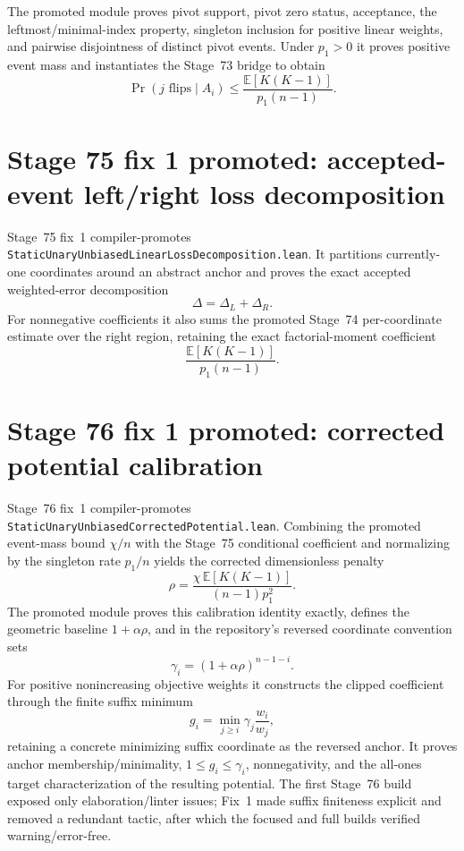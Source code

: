 \documentclass[11pt]{article}
\begin{document}
The promoted module proves pivot support, pivot zero status, acceptance, the leftmost/minimal-index property, singleton inclusion for positive linear weights, and pairwise disjointness of distinct pivot events. Under $p_1>0$ it proves positive event mass and instantiates the Stage~73 bridge to obtain
\[
  \Pr(j\text{ flips}\mid A_i)\le
  \frac{\mathbb E[K(K-1)]}{p_1(n-1)}.
\]

\section{Stage 75 fix 1 promoted: accepted-event left/right loss decomposition}

Stage~75 fix~1 compiler-promotes \texttt{StaticUnaryUnbiasedLinearLossDecomposition.lean}. It partitions currently-one coordinates around an abstract anchor and proves the exact accepted weighted-error decomposition
\[
  \Delta=\Delta_L+\Delta_R.
\]
For nonnegative coefficients it also sums the promoted Stage~74 per-coordinate estimate over the right region, retaining the exact factorial-moment coefficient
\[
  \frac{\mathbb E[K(K-1)]}{p_1(n-1)}.
\]

\section{Stage 76 fix 1 promoted: corrected potential calibration}

Stage~76 fix~1 compiler-promotes \texttt{StaticUnaryUnbiasedCorrectedPotential.lean}. Combining the promoted event-mass bound $\chi/n$ with the Stage~75 conditional coefficient and normalizing by the singleton rate $p_1/n$ yields the corrected dimensionless penalty
\[
  \rho=\frac{\chi\,\mathbb E[K(K-1)]}{(n-1)p_1^2}.
\]
The promoted module proves this calibration identity exactly, defines the geometric baseline $1+\alpha\rho$, and in the repository's reversed coordinate convention sets
\[
  \gamma_i=(1+\alpha\rho)^{n-1-i}.
\]
For positive nonincreasing objective weights it constructs the clipped coefficient through the finite suffix minimum
\[
  g_i=\min_{j\ge i}\gamma_j\frac{w_i}{w_j},
\]
retaining a concrete minimizing suffix coordinate as the reversed anchor. It proves anchor membership/minimality, $1\le g_i\le\gamma_i$, nonnegativity, and the all-ones target characterization of the resulting potential. The first Stage~76 build exposed only elaboration/linter issues; Fix~1 made suffix finiteness explicit and removed a redundant tactic, after which the focused and full builds verified warning/error-free.
\end{document}
